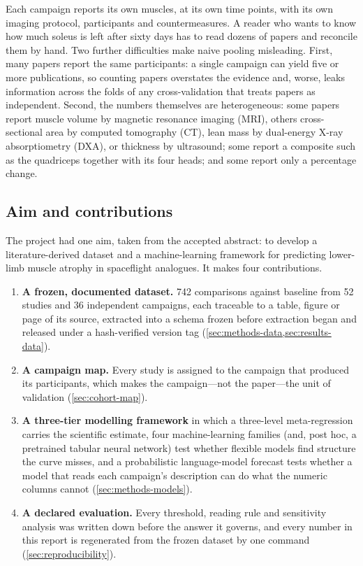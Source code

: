 Each campaign reports its own muscles, at its own time points, with its own imaging protocol, participants and
countermeasures. A reader who wants to know how much soleus is left after sixty days has to read dozens of papers
and reconcile them by hand. Two further difficulties make naive pooling misleading. First, many papers report the
same participants: a single campaign can yield five or more publications, so counting papers overstates the
evidence and, worse, leaks information across the folds of any cross-validation that treats papers as
independent. Second, the numbers themselves are heterogeneous: some papers report muscle volume by magnetic
resonance imaging (MRI), others cross-sectional area by computed tomography (CT), lean mass by dual-energy X-ray
absorptiometry (DXA), or thickness by ultrasound; some report a composite such as the quadriceps together with its
four heads; and some report only a percentage change.

\subsection{Aim and contributions}

The project had one aim, taken from the accepted abstract: to develop a literature-derived dataset and a
machine-learning framework for predicting lower-limb muscle atrophy in spaceflight analogues. It makes four
contributions.

\begin{enumerate}
  \item \textbf{A frozen, documented dataset.} 742 comparisons against baseline from 52 studies and 36 independent
        campaigns, each traceable to a table, figure or page of its source, extracted into a schema frozen before
        extraction began and released under a hash-verified version tag (\cref{sec:methods-data,sec:results-data}).
  \item \textbf{A campaign map.} Every study is assigned to the campaign that produced its participants, which
        makes the campaign---not the paper---the unit of validation (\cref{sec:cohort-map}).
  \item \textbf{A three-tier modelling framework} in which a three-level meta-regression carries the scientific
        estimate, four machine-learning families (and, post hoc, a pretrained tabular neural network) test whether
        flexible models find structure the curve misses, and
        a probabilistic language-model forecast tests whether a model that reads each campaign's description can do
        what the numeric columns cannot (\cref{sec:methods-models}).
  \item \textbf{A declared evaluation.} Every threshold, reading rule and sensitivity analysis was written down
        before the answer it governs, and every number in this report is regenerated from the frozen dataset by
        one command (\cref{sec:reproducibility}).
\end{enumerate}

